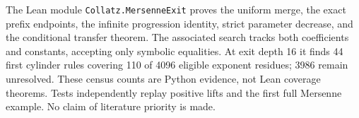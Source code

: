 \documentclass[10pt]{article}
\begin{document}
The Lean module \texttt{Collatz.MersenneExit} proves the uniform merge, the exact prefix endpoints, the infinite progression identity, strict parameter decrease, and the conditional transfer theorem. The associated search tracks both coefficients and constants, accepting only symbolic equalities. At exit depth 16 it finds 44 first cylinder rules covering 110 of 4096 eligible exponent residues; 3986 remain unresolved. These census counts are Python evidence, not Lean coverage theorems. Tests independently replay positive lifts and the first full Mersenne example. No claim of literature priority is made.
\end{document}
